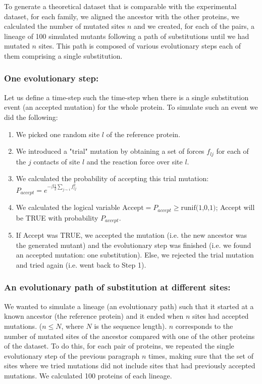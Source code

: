 \documentclass{article}
\begin{document}
\begin{multicols}{2}
{{To generate a theoretical dataset that is comparable with the experimental dataset, for each family, we aligned the ancestor with the other proteins, we calculated the number of mutated sites $n$ and we created, for each of the pairs, a lineage of 100 simulated mutants following a path of substitutions until we had mutated $n$ sites. This path is composed of various evolutionary steps each of them comprising a single substitution.

\subsubsection*{One evolutionary step:}
Let us define a time-step such the time-step when there is a single substitution event (an accepted mutation) for the whole protein. To simulate such an event we did the following:
\begin{enumerate}
\item We picked one random site $l$ of the reference protein.
\item We introduced a "trial" mutation by obtaining a set of forces ${f_{lj}}$ for each of the $j$ contacts of site $l$ and the reaction force over site $l$.
\item We calculated the probability of accepting this trial mutation: $P_{accept} = e^{-\beta \frac{1}{2} \sum_{j\sim i}  f_{lj}^2}$
\item We calculated the logical variable $\text{Accept} = P_{accept} \ge \text{runif(1,0,1)}$; Accept will be TRUE with probability $P_{accept}$.
\item If Accept was TRUE, we accepted the mutation (i.e. the new ancestor was the generated mutant) and the evolutionary step was finished (i.e. we found an accepted mutation: one substitution). Else, we rejected the trial mutation and tried again (i.e. went back to Step 1).
\end{enumerate}

\subsubsection*{An evolutionary path of substitution at different sites:}
We wanted to simulate a lineage (an evolutionary path) such that it started at a known ancestor (the reference protein) and it ended when $n$ sites had accepted mutations. ($n \le N$, where $N$ is the sequence length). $n$ corresponds to the number of mutated sites of the ancestor compared with one of the other proteins of the dataset. To do this, for each pair of proteins, we repeated the single evolutionary step of the previous paragraph $n$ times, making sure that the set of sites where we tried mutations did not include sites that had previously accepted mutations. We calculated 100 proteins of each lineage.

}}
\end{multicols}
\end{document}
